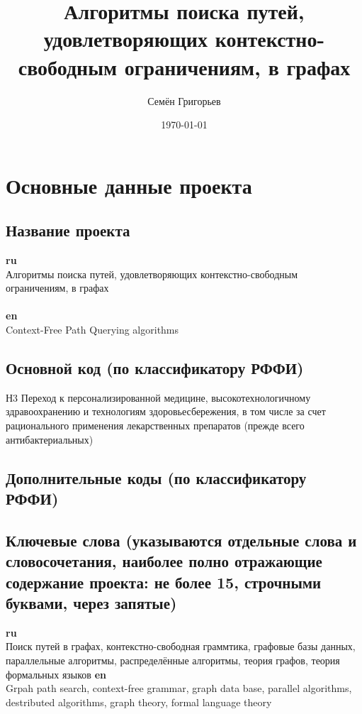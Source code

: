\documentclass[12pt]{article}  %
\title{Алгоритмы поиска путей, удовлетворяющих контекстно-свободным ограничениям, в графах}
\author{Семён Григорьев}
\date{\today}
\theoremstyle{remark}
\begin{document}

\maketitle

\section{Основные данные проекта}

\subsection{Название проекта}

\textbf{ru}\\
%
Алгоритмы поиска путей, удовлетворяющих контекстно-свободным ограничениям, в графах
\\
\\
\textbf{en}\\
Context-Free Path Querying algorithms

\subsection{Основной код (по классификатору РФФИ)}
%
Н3 Переход к персонализированной медицине, высокотехнологичному здравоохранению и технологиям здоровьесбережения, в том числе за счет рационального применения лекарственных препаратов (прежде всего антибактериальных)

\subsection{Дополнительные коды (по классификатору РФФИ)}

\subsection{Ключевые слова (указываются отдельные слова и словосочетания, наиболее полно отражающие содержание проекта: не более 15, строчными буквами, через запятые)}
\textbf{ru}\\
%
Поиск путей в графах, контекстно-свободная граммтика, графовые базы данных, параллельные алгоритмы, распределённые алгоритмы, теория графов, теория формальных языков
\textbf{en}\\
Grpah path search, context-free grammar, graph data base, parallel algorithms, destributed algorithms, graph theory, formal language theory
\end{document}
